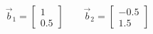 \documentclass[preview]{standalone}
\begin{document}
\begin{align*}
\vec b_1=\begin{bmatrix}1\\0.5\end{bmatrix} \qquad \vec b_2=\begin{bmatrix}-0.5\\1.5\end{bmatrix}
\end{align*}
\end{document}
